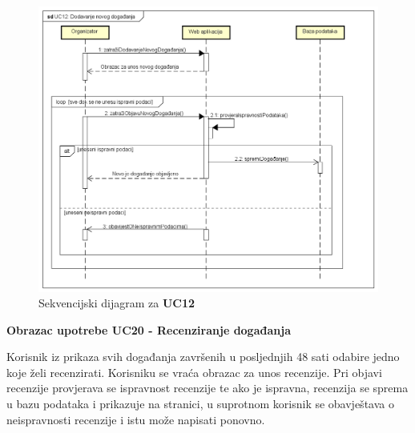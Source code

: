 	\begin{figure}[H]
		\includegraphics[width=\textwidth]{dijagrami/sd1.PNG}
		\centering
		\caption{Sekvencijski dijagram za \textbf{UC12}}
		\label{fig:promjene}
	\end{figure}
	
	\newpage
	
	\noindent \textbf{Obrazac upotrebe UC20 - Recenziranje događanja}
	
	\noindent Korisnik iz prikaza svih događanja završenih u posljednjih 48 sati odabire jedno koje želi recenzirati. Korisniku se vraća obrazac za unos recenzije. Pri objavi recenzije provjerava se ispravnost recenzije te ako je ispravna, recenzija se sprema u bazu podataka i prikazuje na stranici, u suprotnom korisnik se obavještava o neispravnosti recenzije i istu može napisati ponovno.
	
